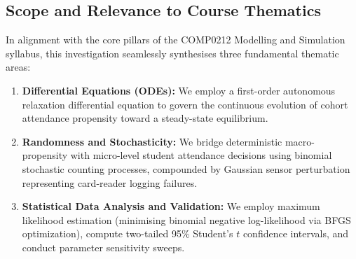 \documentclass{article}
\begin{document}
\subsection{Scope and Relevance to Course Thematics}
In alignment with the core pillars of the COMP0212 Modelling and Simulation syllabus, this investigation seamlessly synthesises three fundamental thematic areas:
\begin{enumerate}
    \item \textbf{Differential Equations (ODEs):} We employ a first-order autonomous relaxation differential equation to govern the continuous evolution of cohort attendance propensity toward a steady-state equilibrium.
    \item \textbf{Randomness and Stochasticity:} We bridge deterministic macro-propensity with micro-level student attendance decisions using binomial stochastic counting processes, compounded by Gaussian sensor perturbation representing card-reader logging failures.
    \item \textbf{Statistical Data Analysis and Validation:} We employ maximum likelihood estimation (minimising binomial negative log-likelihood via BFGS optimization), compute two-tailed 95\% Student's $t$ confidence intervals, and conduct parameter sensitivity sweeps.
\end{enumerate}
\end{document}
